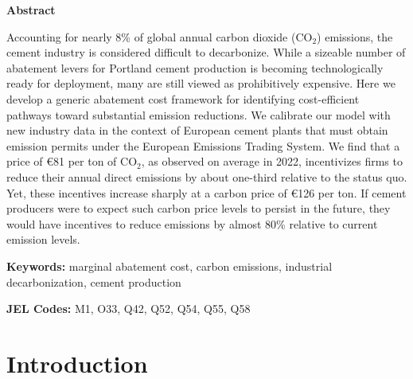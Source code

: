 \documentclass[12pt, a4paper]{article} %
\newcommand{\noin}{\noindent}
\begin{document}
\newpage
\noin \textbf{Abstract}

\noin
Accounting for nearly 8\% of global annual carbon dioxide (CO$_2$) emissions, the cement industry is considered difficult to decarbonize. While a sizeable number of abatement levers for Portland cement production is becoming technologically ready for deployment, many are still viewed as prohibitively expensive. Here we develop a generic abatement cost framework for identifying cost-efficient pathways toward substantial emission reductions. We calibrate our model with new industry data in the context of European cement plants that must obtain emission permits under the European Emissions Trading System. We find that a price of \euro 81 per ton of CO$_2$, as observed on average in 2022, incentivizes firms to reduce their annual direct emissions by about one-third relative to the status quo. Yet, these incentives increase sharply at a carbon price of \euro 126 per ton. If cement producers were to expect such carbon price levels to persist in the future, they would have incentives to reduce emissions by almost 80\% relative to current emission levels.

\bigskip

\noin \textbf{Keywords:} marginal abatement cost, carbon emissions, industrial decarbonization, cement production

\noin \textbf{JEL Codes:} M1, O33, Q42, Q52, Q54, Q55, Q58

\newpage
{}
\setcounter{page}{1}

\section{Introduction}
\label{sec: intro}
\end{document}
